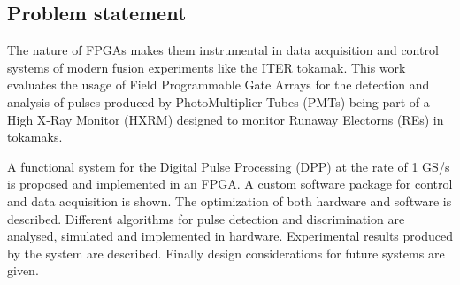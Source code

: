 \subsection{Problem statement}

The nature of FPGAs makes them instrumental in data acquisition 
and control systems of modern fusion experiments like the ITER tokamak.
This work evaluates the usage of Field Programmable Gate Arrays
for the detection and analysis of pulses produced by PhotoMultiplier Tubes (PMTs)
being part of a High X-Ray Monitor (HXRM) designed to monitor Runaway Electorns
(REs) in tokamaks.


A functional system for the Digital Pulse Processing (DPP) at the rate of 
1 GS/s is proposed and implemented in an FPGA. A custom
software package for control and data acquisition is shown.
The optimization of both hardware and software is described.
Different algorithms for pulse detection and discrimination
are analysed, simulated and implemented in hardware. Experimental
results produced by the system are described. Finally design
considerations for future systems are given.

